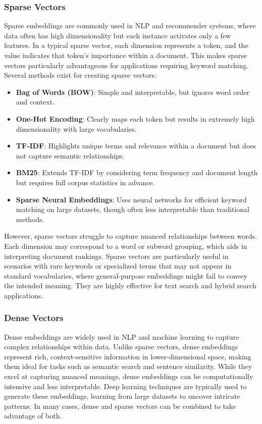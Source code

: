\subsubsection{Sparse Vectors}

Sparse embeddings are commonly used in NLP and recommender systems, where data often has high dimensionality but each instance activates only a few features. In a typical sparse vector, each dimension represents a token, and the value indicates that token’s importance within a document. This makes sparse vectors particularly advantageous for applications requiring keyword matching. Several methods exist for creating sparse vectors:

\begin{itemize}
    \item \textbf{Bag of Words (BOW)}: Simple and interpretable, but ignores word order and context.
    \item \textbf{One-Hot Encoding}: Clearly maps each token but results in extremely high dimensionality with large vocabularies.
    \item \textbf{TF-IDF}: Highlights unique terms and relevance within a document but does not capture semantic relationships.
    \item \textbf{BM25}: Extends TF-IDF by considering term frequency and document length but requires full corpus statistics in advance.
    \item \textbf{Sparse Neural Embeddings}: Uses neural networks for efficient keyword matching on large datasets, though often less interpretable than traditional methods.
\end{itemize}

However, sparse vectors struggle to capture nuanced relationships between words. Each dimension may correspond to a word or subword grouping, which aids in interpreting document rankings. Sparse vectors are particularly useful in scenarios with rare keywords or specialized terms that may not appear in standard vocabularies, where general-purpose embeddings might fail to convey the intended meaning. They are highly effective for text search and hybrid search applications.

\subsubsection{Dense Vectors}

Dense embeddings are widely used in NLP and machine learning to capture complex relationships within data. Unlike sparse vectors, dense embeddings represent rich, context-sensitive information in lower-dimensional space, making them ideal for tasks such as semantic search and sentence similarity. While they excel at capturing nuanced meanings, dense embeddings can be computationally intensive and less interpretable. Deep learning techniques are typically used to generate these embeddings, learning from large datasets to uncover intricate patterns. In many cases, dense and sparse vectors can be combined to take advantage of both.

